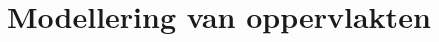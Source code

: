 \documentclass[tmi_notities.tex]{subfiles}
\begin{document}
\chapter{Modellering van oppervlakten}
\end{document}
